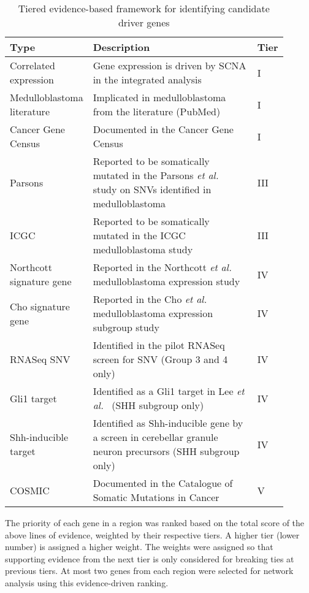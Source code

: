 \begin{table}[H]
	\caption[Tiered evidence-based framework for identifying candidate driver genes]
	{
		Tiered evidence-based framework for identifying candidate driver genes
	}
	\label{tab:driver-evidence}
	\scriptsize
	\setlength{\extrarowheight}{0.5em}
	\centering
	\begin{tabular}{ p{0.25\linewidth} | p{0.6\linewidth} | p{0.05\linewidth} }
		\hline
		\textbf{Type} & \textbf{Description} & \textbf{Tier} \\
		\hline
		Correlated expression & Gene expression is driven by SCNA in the integrated analysis & I \\
		Medulloblastoma literature & Implicated in medulloblastoma from the literature (PubMed) & I \\
		Cancer Gene Census & Documented in the Cancer Gene Census & I \\
		Parsons & Reported to be somatically mutated in the Parsons \emph{et al.}\ \citeref{parsons11} study on SNVs identified in medulloblastoma & III \\
		ICGC & Reported to be somatically mutated in the ICGC medulloblastoma study & III \\
		Northcott signature gene & Reported in the Northcott \emph{et al.}\ \citeref{northcott11a} medulloblastoma expression study & IV \\
		Cho signature gene & Reported in the Cho \emph{et al.}\ \citeref{cho11} medulloblastoma expression subgroup study & IV \\
		RNASeq SNV & Identified in the pilot RNASeq screen for SNV (Group 3 and 4 only) & IV \\
		Gli1 target & Identified as a Gli1 target in Lee \emph{et al.}\ \citeref{lee10} (SHH subgroup only) & IV \\
		Shh-inducible target & Identified as Shh-inducible gene by a screen in cerebellar granule neuron precursors (SHH subgroup only) & IV \\
		COSMIC & Documented in the Catalogue of Somatic Mutations in Cancer & V \\
		\hline
	\end{tabular}
\end{table}

The priority of each gene in a region was ranked based on the total score of the above lines of evidence, weighted by their respective tiers. A higher tier (lower number) is assigned a higher weight. The weights were assigned so that supporting evidence from the next tier is only considered for breaking ties at previous tiers. At most two genes from each region were selected for network analysis using this evidence-driven ranking.

